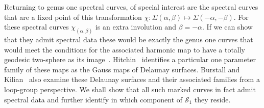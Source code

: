 \documentclass{article}
\begin{document}

Returning to genus one spectral curves, of special interest are the spectral curves that are a fixed point of this transformation $\chi: \Sigma(\alpha,\beta) \mapsto \Sigma(-\alpha,-\beta)$. For these spectral curves $\chi_{(\alpha,\beta)}$ is an extra involution and $\beta=-\alpha$. If we can show that they admit spectral data these would be exactly the genus one curves that would meet the conditions for the associated harmonic map to have a totally geodesic two-sphere as its image~\cite[Theorem~8.20]{Hitchin1990}. Hitchin~\cite[p693]{Hitchin1990} identifies a particular one parameter family of these maps as the Gauss maps of Delaunay surfaces. Burstall and Kilian~\cite{Burstall2006} also examine these Delaunay surfaces and their associated families from a loop-group perspective. We shall show that all such marked curves in fact admit spectral data and further identify in which component of $\mathcal{S}_1$ they reside.
\end{document}
